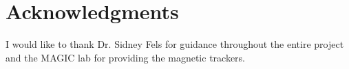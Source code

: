 \documentclass{sig-alternate}
\begin{document}
\section{Acknowledgments}
I would like to thank Dr. Sidney Fels for guidance throughout the entire project
and the MAGIC lab for providing the magnetic trackers.


\end{document}
